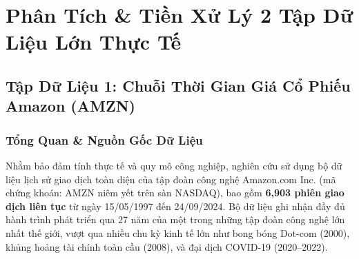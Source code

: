\documentclass[12pt,a4paper]{report}
\begin{document}
\newpage

\chapter{Phân Tích \& Tiền Xử Lý 2 Tập Dữ Liệu Lớn Thực Tế}

\section{Tập Dữ Liệu 1: Chuỗi Thời Gian Giá Cổ Phiếu Amazon (AMZN)}
\subsection{Tổng Quan \& Nguồn Gốc Dữ Liệu}
Nhằm bảo đảm tính thực tế và quy mô công nghiệp, nghiên cứu sử dụng bộ dữ liệu lịch sử giao dịch toàn diện của tập đoàn công nghệ Amazon.com Inc. (mã chứng khoán: AMZN niêm yết trên sàn NASDAQ), bao gồm \textbf{6,903 phiên giao dịch liên tục} từ ngày 15/05/1997 đến 24/09/2024. Bộ dữ liệu ghi nhận đầy đủ hành trình phát triển qua 27 năm của một trong những tập đoàn công nghệ lớn nhất thế giới, vượt qua nhiều chu kỳ kinh tế lớn như bong bóng Dot-com (2000), khủng hoảng tài chính toàn cầu (2008), và đại dịch COVID-19 (2020--2022).
\end{document}
